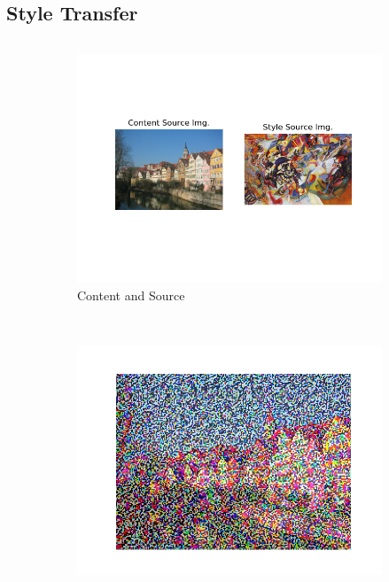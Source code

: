 \documentclass[12pt]{article}
\begin{document}
\newpage
\subsection{Style Transfer}
\begin{scriptsize}
    \inputminted[frame=single,framesep=9pt,linenos, breaklines,xleftmargin=\parindent,xrightmargin=\parindent]{python}{./Homework2/code/style_transfer.py}
\end{scriptsize}
\begin{figure}[htbp]
    \centering
    \begin{subfigure}[t]{0.48\textwidth}
        \centering
        \includegraphics[trim={3in 1in 3in 2in},scale=0.8]{./Homework2/output/hw2p2_fig01.png}
        \caption{Content and Source}
    \label{hw2p2a}
    \end{subfigure}\\
    \begin{subfigure}[t]{0.48\textwidth}
        \centering
        \includegraphics[trim={3in 0in 3in 0in},scale=0.5]{./Homework2/output/hw2p2_fig02.png}

\end{subfigure}
\end{figure}
\end{document}
